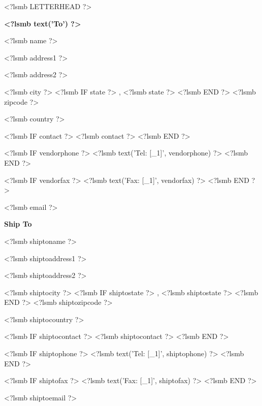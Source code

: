 \documentclass{scrartcl}
\begin{document}
\pagestyle{myheadings}
\thispagestyle{empty}

\fontsize{10pt}{12pt}\selectfont

<?lsmb LETTERHEAD ?>




\vspace*{0.5cm}

\parbox[t]{.5\textwidth}{
\textbf{<?lsmb text('To') ?>}
\vspace{0.3cm}
  
<?lsmb name ?>

<?lsmb address1 ?>

<?lsmb address2 ?>

<?lsmb city ?>
<?lsmb IF state ?>
\hspace{-0.1cm}, <?lsmb state ?>
<?lsmb END ?>
<?lsmb zipcode ?>

<?lsmb country ?>

\vspace{0.3cm}

<?lsmb IF contact ?>
<?lsmb contact ?>
\vspace{0.2cm}
<?lsmb END ?>

<?lsmb IF vendorphone ?>
<?lsmb text('Tel: [_1]', vendorphone) ?>
<?lsmb END ?>

<?lsmb IF vendorfax ?>
<?lsmb text('Fax: [_1]', vendorfax) ?>
<?lsmb END ?>

<?lsmb email ?>
}
\parbox[t]{.5\textwidth}{
\textbf{Ship To}
\vspace{0.3cm}

<?lsmb shiptoname ?>

<?lsmb shiptoaddress1 ?>

<?lsmb shiptoaddress2 ?>

<?lsmb shiptocity ?>
<?lsmb IF shiptostate ?>
\hspace{-0.1cm}, <?lsmb shiptostate ?>
<?lsmb END ?>
<?lsmb shiptozipcode ?>

<?lsmb shiptocountry ?>

\vspace{0.3cm}

<?lsmb IF shiptocontact ?>
<?lsmb shiptocontact ?>
\vspace{0.2cm}
<?lsmb END ?>

<?lsmb IF shiptophone ?>
<?lsmb text('Tel: [_1]', shiptophone) ?>
<?lsmb END ?>

<?lsmb IF shiptofax ?>
<?lsmb text('Fax: [_1]', shiptofax) ?>
<?lsmb END ?>

<?lsmb shiptoemail ?>
}
\hfill
\end{document}
